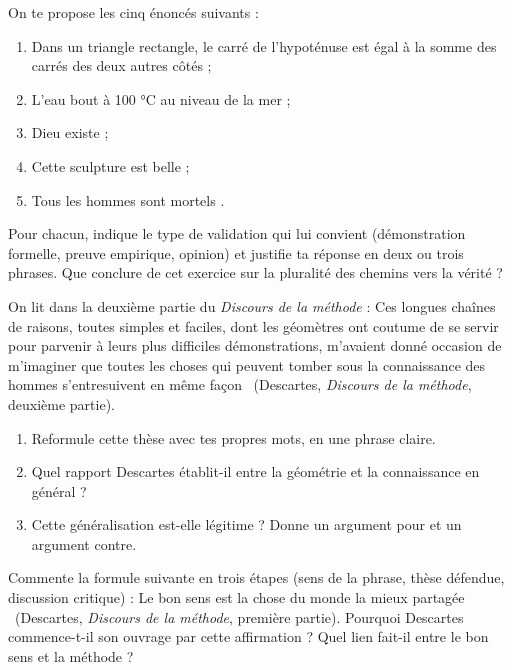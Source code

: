 \documentclass[11pt]{article}
\begin{document}
\begin{exercice}
On te propose les cinq énoncés suivants :
\begin{enumerate}
\item \guillemotleft Dans un triangle rectangle, le carré de l'hypoténuse est égal à la somme des carrés des deux autres côtés \guillemotright ;
\item \guillemotleft L'eau bout à 100 °C au niveau de la mer \guillemotright ;
\item \guillemotleft Dieu existe \guillemotright ;
\item \guillemotleft Cette sculpture est belle \guillemotright ;
\item \guillemotleft Tous les hommes sont mortels \guillemotright.
\end{enumerate}
Pour chacun, indique le type de validation qui lui convient (démonstration formelle, preuve empirique, opinion) et justifie ta réponse en deux ou trois phrases. Que conclure de cet exercice sur la pluralité des chemins vers la vérité ?
\end{exercice}

\begin{exercice}
On lit dans la deuxième partie du \emph{Discours de la méthode} : \guillemotleft Ces longues chaînes de raisons, toutes simples et faciles, dont les géomètres ont coutume de se servir pour parvenir à leurs plus difficiles démonstrations, m'avaient donné occasion de m'imaginer que toutes les choses qui peuvent tomber sous la connaissance des hommes s'entresuivent en même façon \guillemotright\ (Descartes, \emph{Discours de la méthode}, deuxième partie).
\begin{enumerate}
\item Reformule cette thèse avec tes propres mots, en une phrase claire.
\item Quel rapport Descartes établit-il entre la géométrie et la connaissance en général ?
\item Cette généralisation est-elle légitime ? Donne un argument pour et un argument contre.
\end{enumerate}
\end{exercice}

\begin{exercice}
Commente la formule suivante en trois étapes (sens de la phrase, thèse défendue, discussion critique) : \guillemotleft Le bon sens est la chose du monde la mieux partagée \guillemotright\ (Descartes, \emph{Discours de la méthode}, première partie). Pourquoi Descartes commence-t-il son ouvrage par cette affirmation ? Quel lien fait-il entre le bon sens et la méthode ?
\end{exercice}
\end{document}
